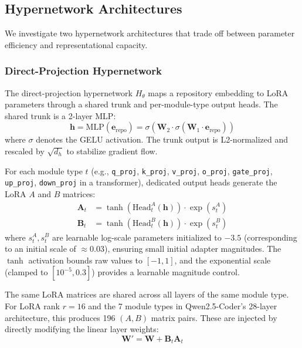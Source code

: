 \documentclass[11pt]{article}
\begin{document}
\subsection{Hypernetwork Architectures}
\label{sec:hypernetwork}

We investigate two hypernetwork architectures that trade off between parameter efficiency and representational capacity.

\subsubsection{Direct-Projection Hypernetwork}
\label{sec:direct_proj}

The direct-projection hypernetwork $H_\theta$ maps a repository embedding to LoRA parameters through a shared trunk and per-module-type output heads.
The shared trunk is a 2-layer MLP:
\begin{equation}
    \mathbf{h} = \text{MLP}(\mathbf{e}_\text{repo}) = \sigma(\mathbf{W}_2 \cdot \sigma(\mathbf{W}_1 \cdot \mathbf{e}_\text{repo}))
\end{equation}
where $\sigma$ denotes the GELU activation.
The trunk output is L2-normalized and rescaled by $\sqrt{d_h}$ to stabilize gradient flow.

For each module type $t$ (e.g., \texttt{q\_proj}, \texttt{k\_proj}, \texttt{v\_proj}, \texttt{o\_proj}, \texttt{gate\_proj}, \texttt{up\_proj}, \texttt{down\_proj} in a transformer), dedicated output heads generate the LoRA $A$ and $B$ matrices:
\begin{align}
    \mathbf{A}_t &= \tanh(\text{Head}^A_t(\mathbf{h})) \cdot \exp(s^A_t) \\
    \mathbf{B}_t &= \tanh(\text{Head}^B_t(\mathbf{h})) \cdot \exp(s^B_t)
\end{align}
where $s^A_t, s^B_t$ are learnable log-scale parameters initialized to $-3.5$ (corresponding to an initial scale of $\approx 0.03$), ensuring small initial adapter magnitudes.
The $\tanh$ activation bounds raw values to $[-1, 1]$, and the exponential scale (clamped to $[10^{-5}, 0.3]$) provides a learnable magnitude control.

The same LoRA matrices are shared across all layers of the same module type.
For LoRA rank $r = 16$ and the 7 module types in Qwen2.5-Coder's 28-layer architecture, this produces 196 $(A, B)$ matrix pairs.
These are injected by directly modifying the linear layer weights:
\begin{equation}
    \mathbf{W}' = \mathbf{W} + \mathbf{B}_t \mathbf{A}_t
\end{equation}
\end{document}
